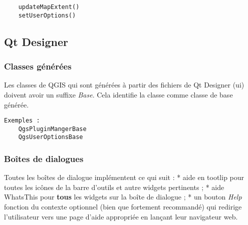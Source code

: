 \begin{verbatim}
	updateMapExtent()
	setUserOptions()
\end{verbatim}

\subsection{Qt Designer}
\subsubsection{Classes g\'en\'er\'ees}
Les classes de QGIS qui sont g\'en\'er\'ees \`a partir des fichiers de Qt Designer (ui) doivent avoir un suffixe \textit{Base}. Cela identifie la classe comme classe de base g\'en\'er\'ee.

\begin{verbatim}
Exemples :
	QgsPluginMangerBase
	QgsUserOptionsBase
\end{verbatim}
\subsubsection{Bo\^ites de dialogues}
Toutes les bo\^ites de dialogue impl\'ementent ce qui suit :
 * aide en tootlip pour toutes les ic\^ones de la barre d'outils et autre widgets pertinents ;
  * aide WhatsThis pour \textbf{tous} les widgets sur la bo\^ite de dialogue ;
  * un bouton \textit{Help} fonction du contexte optionnel (bien que fortement recommand\'e) qui redirige l'utilisateur vers une page d'aide appropri\'ee en lan\c{c}ant leur navigateur web.

